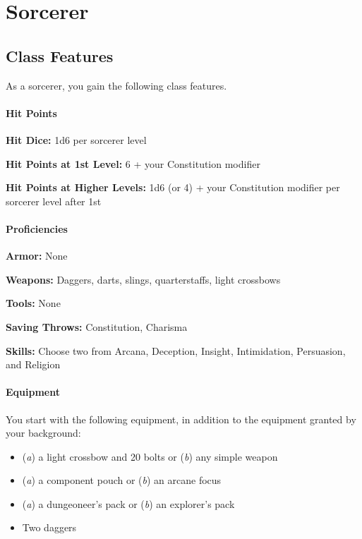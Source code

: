 \documentclass[
]{article}
\date{}
\providecommand{\tightlist}{%
  \setlength{\itemsep}{0pt}\setlength{\parskip}{0pt}}
\begin{document}
\hypertarget{sorcerer}{%
\section{Sorcerer}\label{sorcerer}}

\hypertarget{class-features}{%
\subsection{Class Features}\label{class-features}}

As a sorcerer, you gain the following class features.

\hypertarget{hit-points}{%
\paragraph{Hit Points}\label{hit-points}}

\textbf{Hit Dice:} 1d6 per sorcerer level

\textbf{Hit Points at 1st Level:} 6 + your Constitution modifier

\textbf{Hit Points at Higher Levels:} 1d6 (or 4) + your Constitution
modifier per sorcerer level after 1st

\hypertarget{proficiencies}{%
\paragraph{Proficiencies}\label{proficiencies}}

\textbf{Armor:} None

\textbf{Weapons:} Daggers, darts, slings, quarterstaffs, light crossbows

\textbf{Tools:} None

\textbf{Saving Throws:} Constitution, Charisma

\textbf{Skills:} Choose two from Arcana, Deception, Insight,
Intimidation, Persuasion, and Religion

\hypertarget{equipment}{%
\paragraph{Equipment}\label{equipment}}

You start with the following equipment, in addition to the equipment
granted by your background:

\begin{itemize}
\tightlist
\item
  (\emph{a}) a light crossbow and 20 bolts or (\emph{b}) any simple
  weapon
\item
  (\emph{a}) a component pouch or (\emph{b}) an arcane focus
\item
  (\emph{a}) a dungeoneer's pack or (\emph{b}) an explorer's pack
\item
  Two daggers
\end{itemize}
\end{document}
